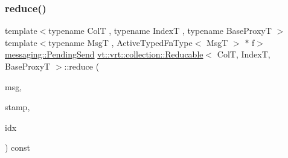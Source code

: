 \mbox{\label{structvt_1_1vrt_1_1collection_1_1_reducable_a9a8ad5efbc4314a9658d3bae4f881010}} 
\subsubsection{\texorpdfstring{reduce()}{reduce()}\hspace{0.1cm}{\footnotesize\ttfamily [8/8]}}
{\footnotesize\ttfamily template$<$typename ColT , typename IndexT , typename Base\+ProxyT $>$ \\
template$<$typename MsgT , Active\+Typed\+Fn\+Type$<$ Msg\+T $>$ $\ast$ f$>$ \\
\hyperlink{structvt_1_1messaging_1_1_pending_send}{messaging\+::\+Pending\+Send} \hyperlink{structvt_1_1vrt_1_1collection_1_1_reducable}{vt\+::vrt\+::collection\+::\+Reducable}$<$ ColT, IndexT, Base\+ProxyT $>$\+::reduce (\begin{DoxyParamCaption}\item[{MsgT $\ast$const}]{msg,  }\item[{\hyperlink{structvt_1_1vrt_1_1collection_1_1_reducable_a19f80baf23f36dad4948ef07322fd0cb}{Reduce\+Stamp}}]{stamp,  }\item[{IndexT const \&}]{idx }\end{DoxyParamCaption}) const}

\mbox{\label{structvt_1_1vrt_1_1collection_1_1_reducable_ac126400bba751792a930f4982df137c9}} 
